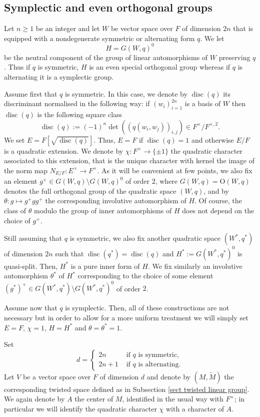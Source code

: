 \documentclass[12pt]{article}
\numberwithin{equation}{section}
\def\tM{\widetilde{M}}
\DeclareMathOperator{\disc}{disc}
\begin{document}
	\subsection{Symplectic and even orthogonal groups}
	
	Let $n\geq 1$ be an integer and let $W$ be vector space over $F$ of dimension $2n$ that is equipped with a nondegenerate symmetric or alternating form $q$. We let
	$$\displaystyle H=G(W,q)^0$$
	be the neutral component of the group of linear automorphisms of $W$ preserving $q$. Thus if $q$ is symmetric, $H$ is an even special orthogonal group whereas if $q$ is alternating it is a symplectic group.
	
	Assume first that $q$ is symmetric. In this case, we denote by $\disc(q)$ its discriminant normalised in the following way: if $(w_i)_{i=1}^{2n}$ is a basis of $W$ then $\disc(q)$ is the following square class 
	$$\displaystyle \disc(q):=(-1)^n \det((q(w_i,w_j))_{i,j})\in F^\times/F^{\times,2}.$$
	We set $E=F[\sqrt{\disc(q)}]$. Thus, $E=F$ if $\disc(q)=1$ and otherwise $E/F$ is a quadratic extension. We denote by $\chi: F^\times \to \{ \pm 1\}$ the quadratic character associated to this extension, that is the unique character with kernel the image of the norm map $N_{E/F}:E^\times\to F^\times$. As it will be convenient at few points, we also fix an element $g^+\in G(W,q)\setminus G(W,q)^0$ of order $2$, where $G(W,q)=\mathrm{O}(W,q)$ denotes the full orthogonal group of the quadratic space $(W,q)$, and by $\theta: g\mapsto g^+ gg^+$ the corresponding involutive automorphism of $H$. Of course, the class of $\theta$ modulo the group of inner automorphisms of $H$ does not depend on the choice of $g^+$. 
	
	Still assuming that $q$ is symmetric, we also fix another quadratic space $(W^*,q^*)$ of dimension $2n$ such that $\disc(q^*)=\disc(q)$ and $H^*:=G(W^*,q^*)^0$ is quasi-split. Then, $H^*$ is a pure inner form of $H$. We fix similarly an involutive automorphism $\theta^*$ of $H^*$ corresponding to the choice of some element $(g^*)^+\in G(W^*,q^*)\setminus G(W^*,q^*)^0$ of order $2$.
	
	Assume now that $q$ is symplectic. Then, all of these constructions are not necessary but in order to allow for a more uniform treatment we will simply set $E=F$, $\chi=1$, $H=H^*$ and $\theta=\theta^*=1$.
	
	Set
	$$\displaystyle d=\left\{\begin{array}{ll}
		2n & \mbox{ if } q \mbox{ is symmetric,} \\
		2n+1 & \mbox{ if } q \mbox{ is alternating.}
	\end{array} \right.$$
	Let $V$ be a vector space over $F$ of dimension $d$ and denote by $(M,\tM)$ the corresponding twisted space defined as in Subsection \ref{sect twisted linear group}. We again denote by $A$ the center of $M$, identified in the usual way with $F^\times$; in particular we will identify the quadratic character $\chi$ with a character of $A$.
	
\end{document}

